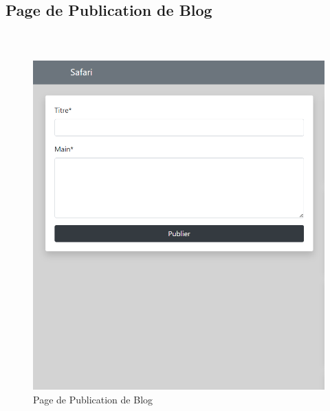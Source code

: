 \begin{enumerate}
\section{Page de Publication de Blog}

\renewcommand{\thefigure}{9}
  \paragraph{\\}
\begin{center}
    \begin{figure}[htbp]
        \centering
        \includegraphics[width=1\linewidth, height=0.65\textheight]{images/publication_third.png} 
        \caption{Page de Publication de Blog}
        \label{fig:Page de Publication de Blog}
    \end{figure}
\end{center}
    
   
  \paragraph{\\}
  
    \paragraph{\\}
  

\end{enumerate}

